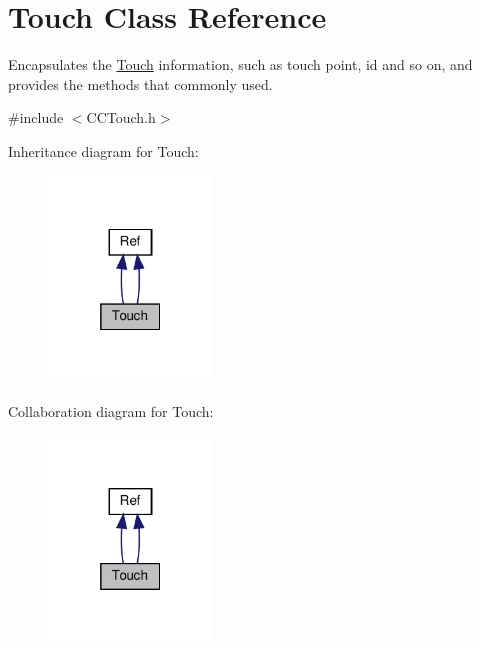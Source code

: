 \hypertarget{classTouch}{}\section{Touch Class Reference}
\label{classTouch}


Encapsulates the \hyperlink{classTouch}{Touch} information, such as touch point, id and so on, and provides the methods that commonly used.  




{\ttfamily \#include $<$C\+C\+Touch.\+h$>$}



Inheritance diagram for Touch\+:
\nopagebreak
\begin{figure}[H]
\begin{center}
\leavevmode
\includegraphics[width=124pt]{classTouch__inherit__graph}
\end{center}
\end{figure}


Collaboration diagram for Touch\+:
\nopagebreak
\begin{figure}[H]
\begin{center}
\leavevmode
\includegraphics[width=124pt]{classTouch__coll__graph}
\end{center}
\end{figure}
